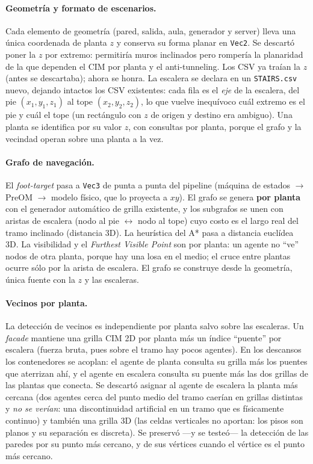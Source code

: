 \documentclass[11pt,a4paper]{article}
\begin{document}
\paragraph{Geometría y formato de escenarios.}
Cada elemento de geometría (pared, salida, aula, generador y server) lleva una única coordenada
de planta $z$ y conserva su forma planar en \texttt{Vec2}. Se descartó poner la $z$ por extremo:
permitiría muros inclinados pero rompería la planaridad de la que dependen el CIM por planta y el
anti-tunneling. Los CSV ya traían la $z$ (antes se descartaba); ahora se honra. La escalera se
declara en un \texttt{STAIRS.csv} nuevo, dejando intactos los CSV existentes: cada fila es el
\emph{eje} de la escalera, del pie $(x_1,y_1,z_1)$ al tope $(x_2,y_2,z_2)$, lo que vuelve
inequívoco cuál extremo es el pie y cuál el tope (un rectángulo con $z$ de origen y destino era
ambiguo). Una planta se identifica por su valor $z$, con consultas por planta, porque el grafo y
la vecindad operan sobre una planta a la vez.

\paragraph{Grafo de navegación.}
El \emph{foot-target} pasa a \texttt{Vec3} de punta a punta del pipeline (máquina de estados
$\rightarrow$ PreOM $\rightarrow$ modelo físico, que lo proyecta a $xy$). El grafo se genera
\textbf{por planta} con el generador automático de grilla existente, y los subgrafos se unen con
aristas de escalera (nodo al pie $\leftrightarrow$ nodo al tope) cuyo costo es el largo real del
tramo inclinado (distancia 3D). La heurística del A* pasa a distancia euclídea 3D. La visibilidad
y el \emph{Furthest Visible Point} son por planta: un agente no ``ve''
nodos de otra planta, porque hay una losa en el medio; el cruce entre plantas ocurre sólo por la
arista de escalera. El grafo se construye desde la geometría, única fuente con la $z$ y las
escaleras.

\paragraph{Vecinos por planta.}
La detección de vecinos es independiente por planta salvo sobre las escaleras. Un \emph{facade}
mantiene una grilla CIM 2D por planta más un índice ``puente'' por escalera (fuerza bruta, pues
sobre el tramo hay pocos agentes). En los descansos los contenedores se acoplan: el agente de
planta consulta su grilla más los puentes que aterrizan ahí, y el agente en escalera consulta su
puente más las dos grillas de las plantas que conecta. Se descartó asignar al agente de escalera
la planta más cercana (dos agentes cerca del punto medio del tramo caerían en grillas distintas y
\emph{no se verían}: una discontinuidad artificial en un tramo que es físicamente continuo) y
también una
grilla 3D (las celdas verticales no aportan: los pisos son planos y su separación es discreta). Se
preservó ---y se testeó--- la detección de las paredes por su punto más cercano, y de sus vértices
cuando el vértice es el punto más cercano.
\end{document}
